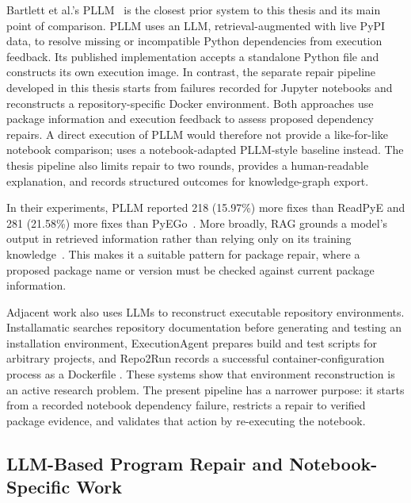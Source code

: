 Bartlett et al.'s PLLM~\cite{bartlett2025pllm} is the closest prior system
to this thesis and its main point of comparison. PLLM uses an LLM,
retrieval-augmented with live PyPI data, to resolve missing or incompatible
Python dependencies from execution feedback. Its published implementation
accepts a standalone Python file and constructs its own execution image. In
contrast, the separate repair pipeline developed in this thesis starts from
failures recorded for Jupyter notebooks and reconstructs a repository-specific
Docker environment. Both approaches use package information and execution
feedback to assess proposed dependency repairs. A direct execution of PLLM
would therefore not provide a like-for-like notebook comparison;
 uses a notebook-adapted PLLM-style baseline
instead. The thesis pipeline also limits repair to two rounds, provides a
human-readable explanation, and records structured outcomes for
knowledge-graph export.

In their experiments, PLLM reported 218 (15.97\%) more fixes than ReadPyE and
281 (21.58\%) more fixes than PyEGo~\cite{bartlett2025pllm}. More broadly,
RAG grounds a model's output in retrieved information rather than relying only
on its training knowledge~\cite{lewis2020rag,gao2024ragsurvey,tao2025racg}.
This makes it a suitable pattern for package repair, where a proposed package
name or version must be checked against current package information.

Adjacent work also uses LLMs to reconstruct executable repository
environments. Installamatic searches repository documentation before generating
and testing an installation environment, ExecutionAgent prepares build and
test scripts for arbitrary projects, and Repo2Run records a successful
container-configuration process as a Dockerfile
\cite{milliken2024installamatic,bouzenia2025executionagent,hu2025repo2run}.
These systems show that environment reconstruction is an active research
problem. The present pipeline has a narrower purpose: it starts from a
recorded notebook dependency failure, restricts a repair to verified package
evidence, and validates that action by re-executing the notebook.

\subsection{LLM-Based Program Repair and Notebook-Specific Work}
\label{sec:rw-apr}

